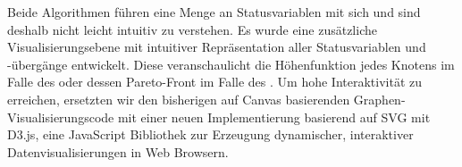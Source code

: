 Beide Algorithmen führen eine Menge an Statusvariablen mit sich und sind deshalb nicht leicht intuitiv zu verstehen. Es wurde eine zusätzliche Visualisierungsebene mit intuitiver Repräsentation aller Statusvariablen und -übergänge entwickelt. Diese veranschaulicht die Höhenfunktion jedes Knotens im Falle des \pushRelabelDE{} oder dessen Pareto-Front im Falle des . Um hohe Interaktivität zu erreichen, ersetzten wir den bisherigen auf Canvas basierenden Graphen-Visualisierungscode mit einer neuen Implementierung basierend auf SVG mit D3.js, eine JavaScript Bibliothek zur Erzeugung dynamischer, interaktiver Datenvisualisierungen in Web Browsern.

